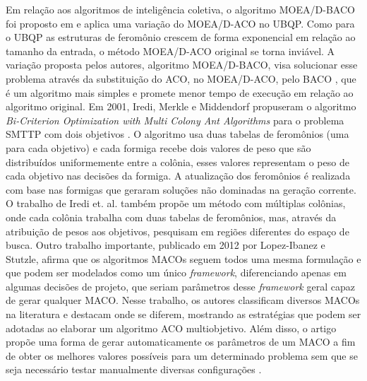 Em relação aos algoritmos de inteligência coletiva, o algoritmo MOEA/D-BACO foi proposto em \cite{SouzaPozo2015} e aplica uma variação do MOEA/D-ACO no \ac{UBQP}. Como para o UBQP as estruturas de feromônio crescem de forma exponencial em relação ao tamanho da entrada, o método MOEA/D-ACO original se torna inviável. A variação proposta pelos autores, algoritmo MOEA/D-BACO, visa solucionar esse problema através da substituição do ACO, no MOEA/D-ACO, pelo \ac{BACO} \cite{baco2006}, que é um algoritmo mais simples e promete menor tempo de execução em relação ao algoritmo original. Em 2001, Iredi, Merkle e Middendorf propuseram o algoritmo \textit{Bi-Criterion Optimization with Multi Colony Ant Algorithms} para o problema \ac{SMTTP} com dois objetivos \cite{BiCriterionAnt}. O algoritmo usa duas tabelas de feromônios (uma para cada objetivo) e cada formiga recebe dois valores de peso que são distribuídos uniformemente entre a colônia, esses valores representam o peso de cada objetivo nas decisões da formiga. A atualização dos feromônios é realizada com base nas formigas que geraram soluções não dominadas na geração corrente. O trabalho de Iredi et. al. também propõe um método com múltiplas colônias, onde cada colônia trabalha com duas tabelas de feromônios, mas, através da atribuição de pesos aos objetivos, pesquisam em regiões diferentes do espaço de busca. Outro trabalho importante, publicado em 2012 por Lopez-Ibanez e Stutzle, afirma que os algoritmos \acp{MACO} seguem todos uma mesma formulação e que podem ser modelados como um único \textit{framework}, diferenciando apenas em algumas decisões de projeto, que seriam parâmetros desse \textit{framework} geral capaz de gerar qualquer MACO. Nesse trabalho, os autores classificam diversos MACOs na literatura e destacam onde se diferem, mostrando as estratégias que podem ser adotadas ao elaborar um algoritmo ACO multiobjetivo. Além disso, o artigo propõe uma forma de gerar automaticamente os parâmetros de um MACO a fim de obter os melhores valores possíveis para um determinado problema sem que se seja necessário testar manualmente diversas configurações \cite{Ibanez2012}.